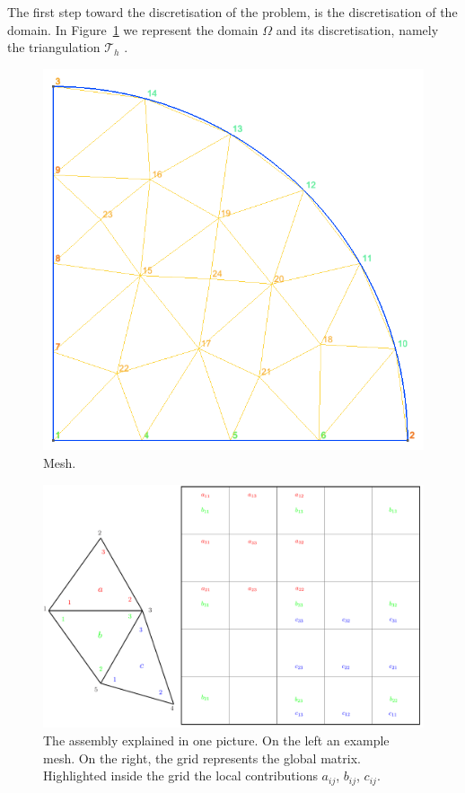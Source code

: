 \documentclass[11pt]{amsart}
\begin{document}
The first step toward the discretisation of the problem, is the discretisation 
of the domain. In Figure~\ref{fig:mesh} we represent the domain $\Omega$ and its 
discretisation, namely the triangulation $\mathcal{T}_h$ .

\begin{figure}[h]
\centering
\includegraphics[scale=.3]{mesh.png}
\caption{Mesh.}
\label{fig:mesh}
\end{figure}

\begin{figure}[h]
\centering
\includegraphics[scale=.8]{assembly-pics.pdf}
\caption{The assembly explained in one picture. On the left an example 
mesh. On the right, the grid represents the global matrix. Highlighted inside the 
grid the local contributions $a_{ij}$, $b_{ij}$, $c_{ij}$.}
\label{fig:assembly}
\end{figure}
\end{document}
